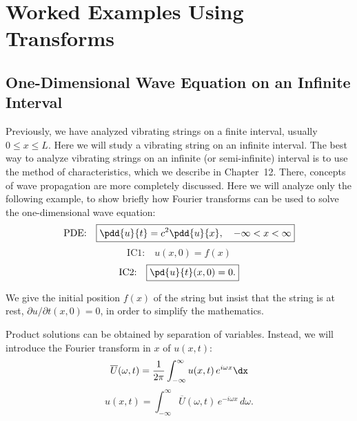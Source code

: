 \section{Worked Examples Using Transforms}
\label{sec:ft-examples}

\subsection{One-Dimensional Wave Equation on an Infinite Interval}
\label{subsec:wave-infinite}

Previously, we have analyzed vibrating strings on a finite interval, usually $0 \le x \le L$.  Here we will study a vibrating string on an infinite interval.  The best way to analyze vibrating strings on an infinite (or semi-infinite) interval is to use the method of characteristics, which we describe in Chapter~12.  There, concepts of wave propagation are more completely discussed.  Here we will analyze only the following example, to show briefly how Fourier transforms can be used to solve the one-dimensional wave equation:
\begin{equation}
\label{eq:wave-pde}
\text{PDE:}\quad \boxed{\pdd{u}{t} = c^2\pdd{u}{x}, \quad -\infty < x < \infty}
\end{equation}
\begin{equation}
\label{eq:wave-ic1}
\text{IC1:}\quad \boxed{u(x,0) = f(x)}
\end{equation}
\begin{equation}
\label{eq:wave-ic2}
\text{IC2:}\quad \boxed{\pd{u}{t}(x,0) = 0.}
\end{equation}

We give the initial position $f(x)$ of the string but insist that the string is at rest, $\partial u/\partial t(x,0) = 0$, in order to simplify the mathematics.

Product solutions can be obtained by separation of variables.  Instead, we will introduce the Fourier transform in $x$ of $u(x,t)$:
\begin{equation}
\label{eq:wave-ft-def}
\overline{U}(\omega,t) = \frac{1}{2\pi}\int_{-\infty}^{\infty}u(x,t)\,e^{i\omega x}\dx
\end{equation}
\begin{equation}
\label{eq:wave-ft-inv}
u(x,t) = \int_{-\infty}^{\infty}\overline{U}(\omega,t)\,e^{-i\omega x}\,d\omega.
\end{equation}

